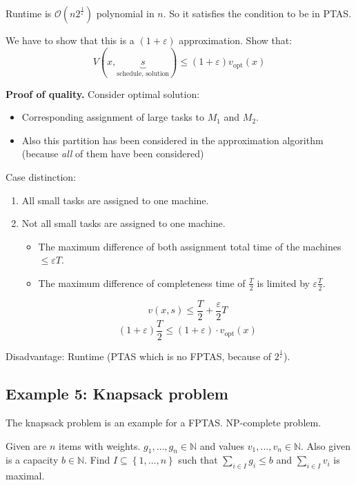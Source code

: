 \documentclass[a4paper]{article}
\newcommand{\cls}[1]{\rm{#1}}
\newcommand{\set}[1]{\left\{#1\right\}}
\begin{document}
Runtime is $\mathcal{O}(n 2^{\frac1{\varepsilon}})$ polynomial in $n$.
So it satisfies the condition to be in PTAS.

We have to show that this is a $(1 + \varepsilon)$ approximation. Show that:
\[
  V(x, \underbrace{s}_{\text{schedule, solution}})
    \leq (1 + \varepsilon) v_{\text{opt}}(x)
\]

\textbf{Proof of quality.}
Consider optimal solution:
\begin{itemize}
  \item Corresponding assignment of large tasks to $M_1$ and $M_2$.
  \item Also this partition has been considered in the approximation algorithm
        (because \emph{all} of them have been considered)
\end{itemize}

Case distinction:
\begin{enumerate}
  \item All small tasks are assigned to one machine.
  \item Not all small tasks are assigned to one machine.
    \begin{itemize}
      \item The maximum difference of both assignment
            total time of the machines $\leq \varepsilon T$.
      \item The maximum difference of completeness time
            of $\frac{T}{2}$ is limited by $\varepsilon\frac{T}{2}$.
    \end{itemize}
    \[
      v(x, s) \leq \frac{T}{2} + \frac{\varepsilon}{2} T
    \] \[
      (1 + \varepsilon) \frac{T}{2}
      \leq (1 + \varepsilon) \cdot v_{\text{opt}}(x)
    \]
\end{enumerate}

Disadvantage: Runtime (PTAS which is no \cls{FPTAS}, because of $2^{\frac1{\varepsilon}}$).

\subsection{Example 5: Knapsack problem}
\label{sec:approx-knapsack}
%
The knapsack problem is an example for a \cls{FPTAS}. \cls{NP}-complete problem.

Given are $n$ items with weights. $g_1, \ldots, g_n \in \mathbb{N}$ and
values $v_1, \ldots, v_n \in \mathbb{N}$. Also given is a capacity $b \in \mathbb{N}$.
Find $I \subseteq \set{1, \ldots, n}$ such that $\sum_{i \in I} g_i \leq b$ and
$\sum_{i \in I} v_i$ is maximal.
\end{document}
